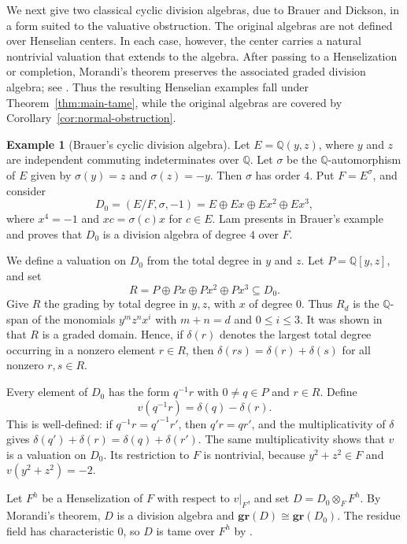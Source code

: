 \documentclass[11pt]{amsart}
\theoremstyle{definition}
\newtheorem{example}[theorem]{Example}
\begin{document}
We next give two classical cyclic division algebras, due to Brauer and Dickson, in a form suited to the valuative obstruction.  The original algebras are not defined over Henselian centers.  In each case, however, the center carries a natural nontrivial valuation that extends to the algebra. After passing to a Henselization or completion, Morandi's theorem preserves the associated graded division algebra; see \cite[Th.~4.1]{TW}. Thus the resulting Henselian examples fall under Theorem~\ref{thm:main-tame}, while the original algebras are covered by Corollary~\ref{cor:normal-obstruction}.

\begin{example}[Brauer's cyclic division algebra]
\label{ex:brauer-cyclic}
Let $E=\mathbb Q(y,z)$, where $y$ and $z$ are independent commuting indeterminates over $\mathbb Q$.  Let $\sigma$ be the $\mathbb Q$-automorphism of $E$ given by $\sigma(y)=z$ and $\sigma(z)=-y$.  Then $\sigma$ has order
$4$.  Put $F=E^\sigma$, and consider
\[
        D_0=(E/F,\sigma,-1)
        =
        E\oplus Ex\oplus Ex^2\oplus Ex^3,
\]
where $x^4=-1$ and $xc=\sigma(c)x$ for $c\in E$.  Lam presents in \cite[pp.~224--226]{L} Brauer's example and proves that $D_0$ is a division algebra of degree $4$ over $F$.

We define a valuation on $D_0$ from the total degree in $y$ and $z$.  Let
$P=\mathbb Q[y,z]$, and set 
$$
R=P\oplus Px\oplus Px^2\oplus Px^3\subseteq D_0.
$$
Give $R$ the grading by total degree in $y,z$, with $x$ of degree $0$.  Thus $R_d$ is the $\mathbb Q$-span of the monomials $y^m z^n x^i$ with $m+n=d$ and $0\leq i\leq 3$.  It was shown in \cite{L} that $R$ is a graded domain.  Hence, if $\delta(r)$ denotes the largest total degree occurring in a nonzero element $r\in R$, then $\delta(rs)=\delta(r)+\delta(s)$ for all nonzero $r,s\in R$.

Every element of $D_0$ has the form $q^{-1}r$ with $0\ne q\in P$ and
$r\in R$.  Define
\[
        v(q^{-1}r)=\delta(q)-\delta(r).
\]
This is well-defined: if $q^{-1}r=q'^{-1}r'$, then $q'r=qr'$, and the multiplicativity of $\delta$ gives
$\delta(q')+\delta(r)=\delta(q)+\delta(r')$.  The same multiplicativity shows that $v$ is a valuation on $D_0$.  Its restriction to $F$ is nontrivial, because $y^2+z^2\in F$ and $v(y^2+z^2)=-2$.

Let $F^h$ be a Henselization of $F$ with respect to $v|_F$, and set $D=D_0\otimes_F F^h$.  By Morandi's theorem, $D$ is a division algebra and $\mathbf{gr}(D)\cong\mathbf{gr}(D_0)$.  The residue field has characteristic $0$, so $D$ is tame over $F^h$ by  \cite[Def.~8.4]{TW}.


\end{example}
\end{document}
